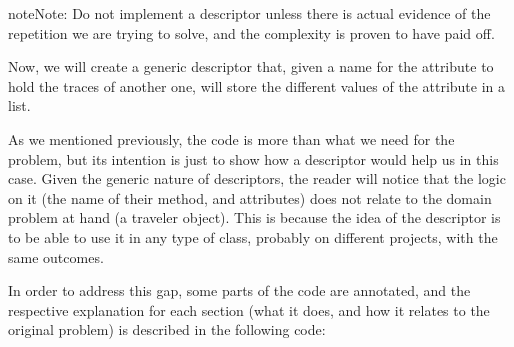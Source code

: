 \documentclass[a4paper,10pt,english]{sphinxmanual}
\begin{document}
\begin{sphinxadmonition}{note}{Note:}
Do not implement a descriptor unless there is actual evidence of the repetition we are trying to solve, and the complexity is proven to have paid off.
\end{sphinxadmonition}

Now, we will create a generic descriptor that, given a name for the attribute to hold the
traces of another one, will store the different values of the attribute in a list.

As we mentioned previously, the code is more than what we need for the problem, but its
intention is just to show how a descriptor would help us in this case. Given the generic
nature of descriptors, the reader will notice that the logic on it (the name of their method,
and attributes) does not relate to the domain problem at hand (a traveler object). This is
because the idea of the descriptor is to be able to use it in any type of class, probably on
different projects, with the same outcomes.

In order to address this gap, some parts of the code are annotated, and the respective
explanation for each section (what it does, and how it relates to the original problem) is
described in the following code:
\end{document}
